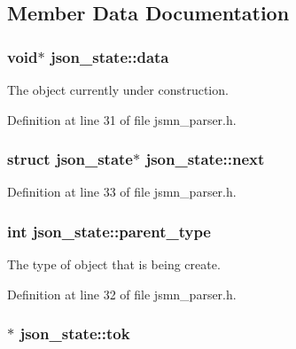 \subsection{Member Data Documentation}
\hypertarget{structjson__state_acc079826c9aec290370460c6a5b0cdc8}{
\subsubsection[{data}]{\setlength{\rightskip}{0pt plus 5cm}void$\ast$ json\-\_\-state\-::data}}\label{structjson__state_acc079826c9aec290370460c6a5b0cdc8}


The object currently under construction. 



Definition at line 31 of file jsmn\-\_\-parser.\-h.

\hypertarget{structjson__state_a62a49f4c9101a8e5a93a757c74060b25}{
\subsubsection[{next}]{\setlength{\rightskip}{0pt plus 5cm}struct {\bf json\-\_\-state}$\ast$ json\-\_\-state\-::next}}\label{structjson__state_a62a49f4c9101a8e5a93a757c74060b25}


Definition at line 33 of file jsmn\-\_\-parser.\-h.

\hypertarget{structjson__state_a89afcce72accc1241265f843ec7d6f40}{
\subsubsection[{parent\-\_\-type}]{\setlength{\rightskip}{0pt plus 5cm}int json\-\_\-state\-::parent\-\_\-type}}\label{structjson__state_a89afcce72accc1241265f843ec7d6f40}


The type of object that is being create. 



Definition at line 32 of file jsmn\-\_\-parser.\-h.

\hypertarget{structjson__state_a4b6bd5d26604be1ca0783f1b36c01a9f}{
\subsubsection[{tok}]{$\ast$ json\-\_\-state\-::tok}}\label{structjson__state_a4b6bd5d26604be1ca0783f1b36c01a9f}


